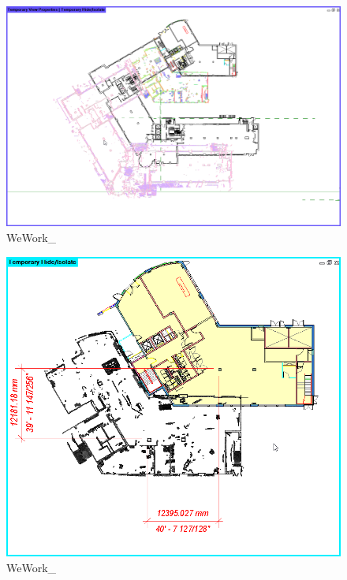 \documentclass[
]{article}
\begin{document}
\begin{figure}[H]

{\centering \includegraphics{assets/WeWork/WeWork-PointCloud-Coordination-2.png}

}

\caption{WeWork\_}

\end{figure}%
\begin{figure}[H]

{\centering \includegraphics{assets/WeWork/WeWork-PointCloud-Coordination.png}

}

\caption{WeWork\_}

\end{figure}%
\end{document}
